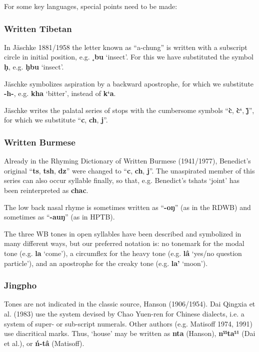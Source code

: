 For some key languages, special points need to be made:

\subsubsection{Written Tibetan}

In Jäschke 1881/1958 the letter known as “a-chung” is written with a subscript circle in initial position, e.g. \textbf{˳bu} ‘insect’. For this we have substituted the symbol \textbf{ḥ}, e.g. \textbf{ḥbu} ‘insect’.

Jäschke symbolizes aspiration by a backward apostrophe, for which we substitute \textbf{-h-}, e.g. \textbf{kha} ‘bitter’, instead of \textbf{k‘a}. 

Jäschke writes the palatal series of stops with the cumbersome symbols “\textbf{c̀}, \textbf{c̀‘}, \textbf{j̀}”, for which we substitute “\textbf{c}, \textbf{ch}, \textbf{j}”. 

\subsubsection{Written Burmese}

Already in the Rhyming Dictionary of Written Burmese (1941/1977), Benedict’s original “\textbf{ts}, \textbf{tsh}, \textbf{dz}” were changed to “\textbf{c}, \textbf{ch}, \textbf{j}”. The unaspirated member of this series can also occur syllable finally, so that, e.g. Benedict’s tshats ‘joint’ has been reinterpreted as \textbf{chac}.

The low back nasal rhyme is sometimes written as “\textbf{-oŋ}” (as in the RDWB) and sometimes as “\textbf{-auŋ}” (as in HPTB).

The three WB tones in open syllables have been described and symbolized in many different ways, but our preferred notation is: no tonemark for the modal tone (e.g. \textbf{la} ‘come’), a circumflex for the heavy tone (e.g. \textbf{lâ} ‘yes/no question particle’), and an apostrophe for the creaky tone (e.g. \textbf{la’} ‘moon’).

\subsubsection{Jingpho}

Tones are not indicated in the classic source, Hanson (1906/1954). Dai Qingxia et al. (1983) use the system devised by Chao Yuen-ren for Chinese dialects, i.e. a system of super- or sub-script numerals. Other authors (e.g. Matisoff 1974, 1991) use diacritical marks. Thus, ‘house’ may be written as \textbf{nta} (Hanson), \textbf{n⁵⁵ta⁵¹} (Dai et al.), or \textbf{ń-tâ} (Matisoff).

